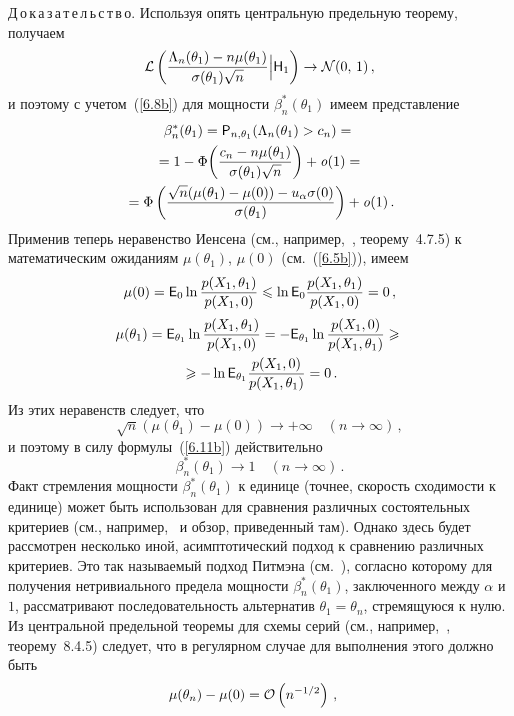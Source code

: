 \begin{multicols}{2}
\noindent
Д\,о\,к\,а\,з\,а\,т\,е\,л\,ь\,с\,т\,в\,о. Используя опять центральную предельную
теорему, получаем
\begin{equation*}
{\cal L}\left (\displaystyle\frac{\displaystyle \Lambda_n(\theta_1)-n\mu(\theta_1)\mathstrut}{\displaystyle \sigma(\theta_1)\sqrt{n}\mathstrut}\Bigl|{\sf H}_1\right )\to {\cal
N}(0,\,1)\,,
\end{equation*} 
и поэтому с учетом~(\ref{6.8b}) для мощности
$\beta_n^*(\theta_1)$ имеем представление
\begin{multline}
\beta_n^*(\theta_1)= {{\sf P}}_{n,\theta_1}(\Lambda_n(\theta_1)>c_n) ={}\\
{}=
1-\Phi\biggl(\displaystyle\frac{\displaystyle c_n - n\mu(\theta_1)\mathstrut}{\displaystyle \sigma(\theta_1)\sqrt{n}\mathstrut}\biggr)+{\it o}(1)= {}\\
{}=\Phi\left(\displaystyle\frac{\displaystyle \sqrt{n}(\mu(\theta_1)-\mu(0))-u_{\alpha}\sigma(0)\mathstrut}{\displaystyle \sigma(\theta_1)\mathstrut}\right)+{\it o}(1)\,. \label{6.11b}
\end{multline}
Применив теперь неравенство Иенсена (см., например,~\cite{4be}, теорему~4.7.5)
к математическим ожиданиям $\mu(\theta_1)$, $\mu(0)$
(см.~(\ref{6.5b})), имеем
$$
\mu(0) ={{\sf E}}_0\ln\displaystyle\frac{\displaystyle p(X_1,\theta_1)\mathstrut}{\displaystyle p(X_1,0)\mathstrut}\leqslant\ln
{{\sf E}}_0\displaystyle\frac{\displaystyle p(X_1,\theta_1)\mathstrut}{\displaystyle p(X_1,0)\mathstrut} = 0\,,
$$
\begin{multline*}
\mu(\theta_1)={{\sf E}}_{\theta_1}\ln\displaystyle\frac{\displaystyle p(X_1,\theta_1)\mathstrut}{\displaystyle p(X_1,0)\mathstrut}
= -{{\sf E}}_{\theta_1}\ln\displaystyle\frac{\displaystyle p(X_1,0)\mathstrut}{\displaystyle p(X_1,\theta_1)\mathstrut}\geqslant{}\\
{}\geqslant
-\ln {{\sf E}}_{\theta_1}\displaystyle\frac{\displaystyle p(X_1,0)\mathstrut}{\displaystyle p(X_1,\theta_1)\mathstrut} = 0\,.
\end{multline*}
Из этих неравенств следует, что
$$
\sqrt{n}(\mu(\theta_1)-\mu(0))\to +\infty\quad (n\to\infty)\,,
$$
и поэтому в силу формулы~(\ref{6.11b}) действительно
$$
\beta_n^*(\theta_1) \to 1\quad  (n \to \infty)\,.
$$
Факт стремления мощности $\beta_n^*(\theta_1)$ к единице (точнее, скорость
сходимости к единице) может быть использован для сравнения
различных состоятельных критериев (см., например,~\cite{16be} и обзор,
приведенный там). Однако здесь будет рассмотрен несколько иной,
асимптотический подход к сравнению различных критериев. Это так
называемый подход Питмэна (см.~\cite{50be}), согласно которому для
получения нетривиального предела мощности $\beta_n^*(\theta_1)$,
заключенного между $\alpha$ и $1$, рассматривают
последовательность альтернатив $\theta_1 = \theta_n$,
стремящуюся к нулю. Из центральной предельной
тео\-ре\-мы для схемы серий (см., например,~\cite{4be}, тео\-ре\-му~8.4.5)
следует, что в регулярном случае для выполнения этого должно быть
\begin{equation*}
\mu(\theta_n)-\mu(0)= {\cal O}\left (n^{-1/2}\right )\,,\quad

\end{equation*}
\end{multicols}
